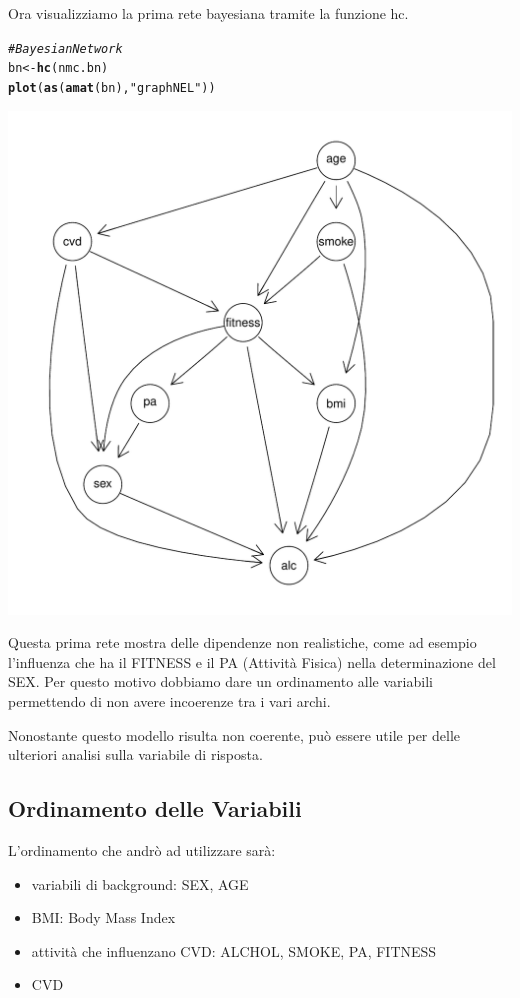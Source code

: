 \documentclass{article}\usepackage[]{graphicx}\usepackage[]{xcolor}
\makeatletter
\def\maxwidth{ %
  \ifdim\Gin@nat@width>\linewidth
    \linewidth
  \else
    \Gin@nat@width
  \fi
}
\newcommand{\hlstr}[1]{\textcolor[rgb]{0.192,0.494,0.8}{#1}}%
\newcommand{\hlcom}[1]{\textcolor[rgb]{0.678,0.584,0.686}{\textit{#1}}}%
\newcommand{\hlstd}[1]{\textcolor[rgb]{0.345,0.345,0.345}{#1}}%
\newcommand{\hlkwb}[1]{\textcolor[rgb]{0.69,0.353,0.396}{#1}}%
\newcommand{\hlkwd}[1]{\textcolor[rgb]{0.737,0.353,0.396}{\textbf{#1}}}%
\newenvironment{kframe}{%
 \def\at@end@of@kframe{}%
 \ifinner\ifhmode%
  \def\at@end@of@kframe{\end{minipage}}%
  \begin{minipage}{\columnwidth}%
 \fi\fi%
 \def\FrameCommand##1{\hskip\@totalleftmargin \hskip-\fboxsep
 \colorbox{shadecolor}{##1}\hskip-\fboxsep
     \hskip-\linewidth \hskip-\@totalleftmargin \hskip\columnwidth}%
 \MakeFramed {\advance\hsize-\width
   \@totalleftmargin\z@ \linewidth\hsize
   \@setminipage}}%
 {\par\unskip\endMakeFramed%
 \at@end@of@kframe}
\newenvironment{knitrout}{}{} %
\makeatother
\begin{document}
    Ora visualizziamo la prima rete bayesiana tramite la funzione hc. 
\begin{knitrout}
\color{fgcolor}\begin{kframe}
\begin{alltt}
\hlcom{#Bayesian Network}
\hlstd{bn} \hlkwb{<-} \hlkwd{hc}\hlstd{(nmc.bn)}
\hlkwd{plot}\hlstd{(}\hlkwd{as}\hlstd{(}\hlkwd{amat}\hlstd{(bn),} \hlstr{"graphNEL"}\hlstd{))}
\end{alltt}
\end{kframe}
\includegraphics[width=\maxwidth]{figure/Bayesian_Network-1} 
\end{knitrout}
    
    Questa prima rete mostra delle dipendenze non realistiche, come ad esempio
    l'influenza che ha il FITNESS e il PA (Attività Fisica) nella determinazione
    del SEX. Per questo motivo dobbiamo dare un ordinamento alle variabili
    permettendo di non avere incoerenze tra i vari archi. \par
    Nonostante questo modello risulta non coerente, può essere utile per delle
    ulteriori analisi sulla variabile di risposta.
    
    \subsection{Ordinamento delle Variabili}
      L'ordinamento che andrò ad utilizzare sarà:
      \begin{itemize}
        \item variabili di background: SEX, AGE
        \item BMI: Body Mass Index
        \item attività che influenzano CVD: ALCHOL, SMOKE, PA, FITNESS
        \item CVD
      \end{itemize}
      
\end{document}
